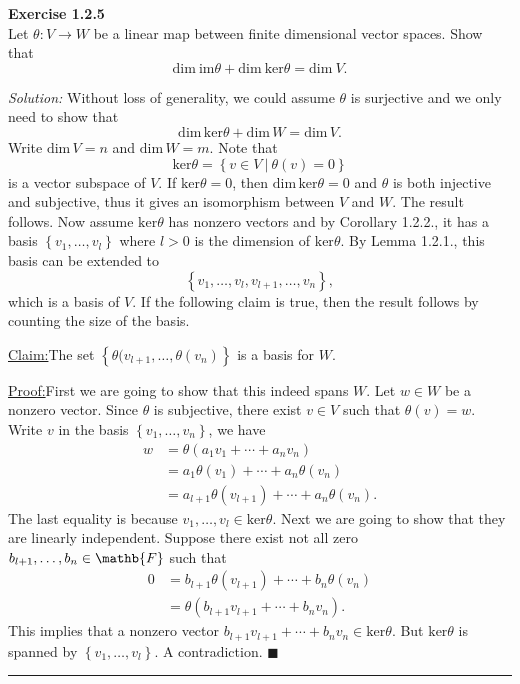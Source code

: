 \documentclass[a4paper, 11pt]{article}
\newenvironment{problem}[2][Exercise]
    { \begin{mdframed}[backgroundcolor=gray!20] \textbf{#1 #2} \\}
    {  \end{mdframed}}
\newenvironment{solution}
    {\textit{Solution:}}
    {}
\newenvironment{claim}[1]{\par\noindent\underline{Claim:}\space#1}{}
\newenvironment{claimproof}[1]{\par\noindent\underline{Proof:}\space#1}{\hfill $\blacksquare$}
\begin{document}
\begin{problem}{1.2.5}
Let \(\theta:V\rightarrow W\) be a linear map between finite dimensional vector spaces. Show that 
$$\text{dim}\ \text{im}\theta +\text{dim}\ \text{ker}\theta =\text{dim}\ V.$$
    
\end{problem}
\begin{solution}
Without loss of generality, we could assume \(\theta\) is surjective and we only need to show that
$$\text{dim}\, \text{ker}\theta+\text{dim}\, W=\text{dim}\, V.$$
Write \(\text{dim}\, V=n\) and \(\text{dim}\, W=m\). Note that 
$$\text{ker}\theta=\left\{ v\in V\ |\ \theta(v)=0 \right\}$$
is a vector subspace of \(V\). If \(\text{ker}\theta=0\), then \(\text{dim}\, \text{ker}\theta=0\) and \(\theta\) is both injective and subjective, thus it gives an isomorphism between \(V\) and \(W\). The result follows. Now assume \(\text{ker}\theta\) has nonzero vectors and by Corollary 1.2.2., it has a basis \(\left\{v_1,\ldots,v_l\right\}\) where \(l>0\) is the dimension of \(\text{ker}\theta\). By Lemma 1.2.1., this basis can be extended to 
$$\left\{v_1,\ldots,v_l,v_{l+1},\ldots,v_n\right\},$$
which is a basis of \(V\). If the following claim is true, then the result follows by counting the size of the basis.
\begin{claim}
The set \(\left\{\theta(v_{l+1},\ldots,\theta(v_n)\right\}\) is a basis for \(W\). 
\end{claim}
\begin{claimproof}
First we are going to show that this indeed spans \(W\). Let \(w\in W\) be a nonzero vector. Since \(\theta\) is subjective, there exist \(v\in V \) such that \(\theta(v)=w\). Write \(v\) in the basis \(\left\{v_1,\ldots,v_n\right\}\), we have 
$$\begin{align*}
    w & = \theta(a_1v_1+\cdots+a_nv_n)\\ 
      & = a_1\theta(v_1)+\cdots+a_n\theta(v_n)\\ 
      & = a_{l+1}\theta(v_{l+1})+\cdots+a_n\theta(v_n).
\end{align*}$$
The last equality is because \(v_1,\ldots,v_l\in \text{ker}\theta\). Next we are going to show that they are linearly independent. Suppose there exist not all zero \(b_{l+1},\ldots,b_n\in \mathb{F}\) such that 
$$\begin{align*}
    0 & =b_{l+1}\theta(v_{l+1})+\cdots+b_n\theta(v_n)\\ 
      & =\theta(b_{l+1}v_{l+1}+\cdots+b_nv_n).
\end{align*}$$
This implies that a nonzero vector \(b_{l+1}v_{l+1}+\cdots+b_nv_n \in \text{ker}\theta\). But \(\text{ker}\theta\) is spanned by \(\left\{v_1,\ldots,v_l\right\}\). A contradiction.
\end{claimproof}
\end{solution}
\noindent\rule{7in}{2.8pt}
\end{document}
